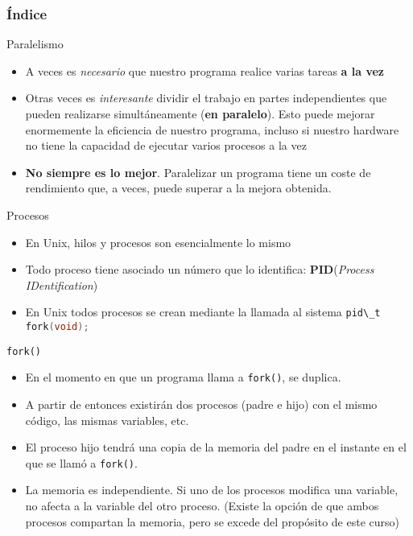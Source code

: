\documentclass{mybeamer}
\institute{
	{\textsl{\large Tema 16}}
	\\[1em]
	\textbf{\Large Fork}
}
\begin{document}
\begin{frame}
\titlepage
\end{frame}

\begin{frame}
\frametitle{Índice}
	\tableofcontents
\end{frame}

\begin{framesec}{Paralelismo}
	\begin{itemize}
		\item A veces es \textit{necesario} que nuestro programa realice
			varias tareas \textbf{a la vez}
		\item Otras veces es \textit{interesante} dividir el trabajo en
			partes independientes que pueden realizarse
			simultáneamente (\textbf{en paralelo}). Esto puede
			mejorar enormemente la eficiencia de nuestro programa,
			incluso si nuestro hardware no tiene la capacidad de
			ejecutar varios procesos a la vez
		\item \textbf{No siempre es lo mejor}. Paralelizar un programa
			tiene un coste de rendimiento que, a veces, puede
			superar a la mejora obtenida.
	\end{itemize}
\end{framesec}

\begin{framesec}{Procesos}
	\begin{itemize}
		\item En Unix, hilos y procesos son esencialmente lo mismo
		\item Todo proceso tiene asociado un número que lo identifica:
			\textbf{PID}(\textit{Process IDentification})
		\item En Unix todos procesos se crean mediante la llamada al
			sistema \lstinline[language=C]{pid\_t fork(void);}
	\end{itemize}
\end{framesec}

\begin{framesec}{\texttt{fork()}}
	\begin{itemize}
		\item En el momento en que un programa llama a \texttt{fork()},
			se duplica.
		\item A partir de entonces existirán dos procesos (padre e hijo)
			con el mismo código, las mismas variables, etc.
		\item El proceso hijo tendrá una copia de la memoria del padre
			en el instante en el que se llamó a \texttt{fork()}.
		\item La memoria es independiente. Si uno de los procesos
			modifica una variable, no afecta a la variable del otro
			proceso. (Existe la opción de que ambos procesos
			compartan la memoria, pero se excede del propósito de
			este curso)
	\end{itemize}
\end{framesec}
\end{document}

